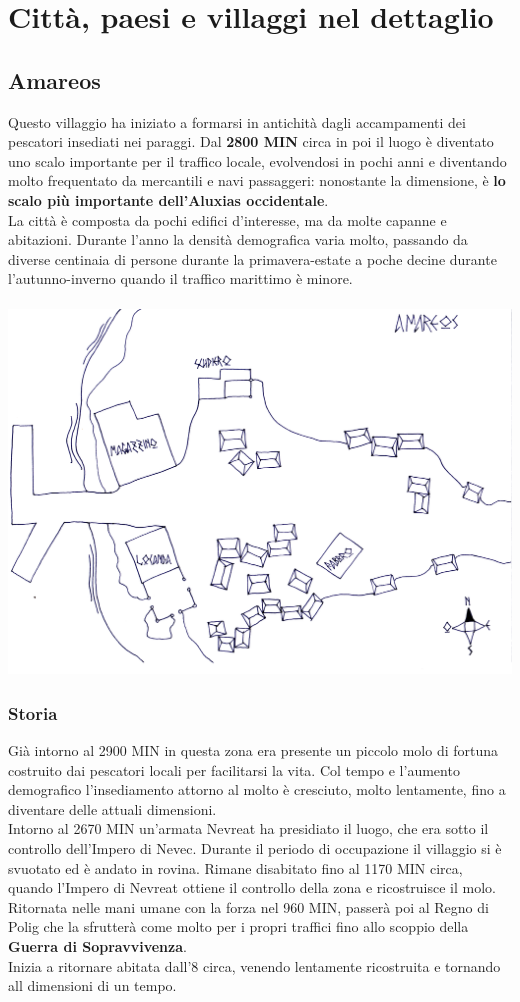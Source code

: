 \documentclass[10pt,twoside,onecolumn,openany]{book}
\begin{document}
\section{Città, paesi e villaggi nel dettaglio}
\subsection{Amareos}
Questo villaggio ha iniziato a formarsi in antichità dagli accampamenti dei pescatori insediati nei paraggi. Dal \textbf{2800 MIN} circa in poi il luogo è diventato uno scalo importante per il traffico locale, evolvendosi in pochi anni e diventando molto frequentato da mercantili e navi passaggeri: nonostante la dimensione, è \textbf{lo scalo più importante dell'Aluxias occidentale}.\\
La città è composta da pochi edifici d'interesse, ma da molte capanne e abitazioni. Durante l'anno la densità demografica varia molto, passando da diverse centinaia di persone durante la primavera-estate a poche decine durante l'autunno-inverno quando il traffico marittimo è minore.\\
\\
\includegraphics[scale=0.6]{Amareos}
\subsubsection{Storia}
Già intorno al 2900 MIN in questa zona era presente un piccolo molo di fortuna costruito dai pescatori locali per facilitarsi la vita. Col tempo e l'aumento demografico l'insediamento attorno al molto è cresciuto, molto lentamente, fino a diventare delle attuali dimensioni.\\
Intorno al 2670 MIN un'armata Nevreat ha presidiato il luogo, che era sotto il controllo dell'Impero di Nevec. Durante il periodo di occupazione il villaggio si è svuotato ed è andato in rovina. Rimane disabitato fino al 1170 MIN circa, quando l'Impero di Nevreat ottiene il controllo della zona e ricostruisce il molo. Ritornata nelle mani umane con la forza nel 960 MIN, passerà poi al Regno di Polig che la sfrutterà come molto per i propri traffici fino allo scoppio della \textbf{Guerra di Sopravvivenza}.\\
Inizia a ritornare abitata dall'8 circa, venendo lentamente ricostruita e tornando all dimensioni di un tempo.
\newpage
\end{document}

